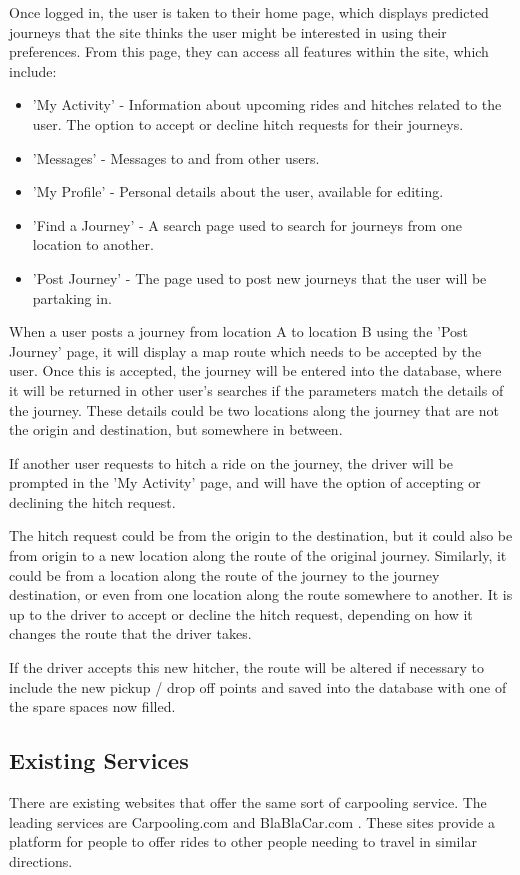 	Once logged in, the user is taken to their home page, which displays predicted journeys that the site thinks the user might be interested in using their preferences. From this page, they can access all features within the site, which include:
	\begin{itemize}
		\item 'My Activity' - Information about upcoming rides and hitches related to the user. The option to accept or decline hitch requests for their journeys.
		\item 'Messages' - Messages to and from other users.
		\item 'My Profile' - Personal details about the user, available for editing.
		\item 'Find a Journey' - A search page used to search for journeys from one location to another.
		\item 'Post Journey' - The page used to post new journeys that the user will be partaking in.		
	\end{itemize}
	
	When a user posts a journey from location A to location B using the 'Post Journey' page, it will display a map route which needs to be accepted by the user. Once this is accepted, the journey will be entered into the database, where it will be returned in other user's searches if the parameters match the details of the journey. These details could be two locations along the journey that are not the origin and destination, but somewhere in between.
	
	If another user requests to hitch a ride on the journey, the driver will be prompted in the 'My Activity' page, and will have the option of accepting or declining the hitch request. 
	
	The hitch request could be from the origin to the destination, but it could also be from origin to a new location along the route of the original journey. Similarly, it could be from a location along the route of the journey to the journey destination, or even from one location along the route somewhere to another. It is up to the driver to accept or decline the hitch request, depending on how it changes the route that the driver takes.
	
	If the driver accepts this new hitcher, the route will be altered if necessary to include the new pickup / drop off points and saved into the database with one of the spare spaces now filled.
	 
\subsection{Existing Services}
	There are existing websites that offer the same sort of carpooling service. The leading services are Carpooling.com \cite{carpooling_com} and BlaBlaCar.com \cite{blabla}. These sites provide a platform for people to offer rides to other people needing to travel in similar directions.
	
